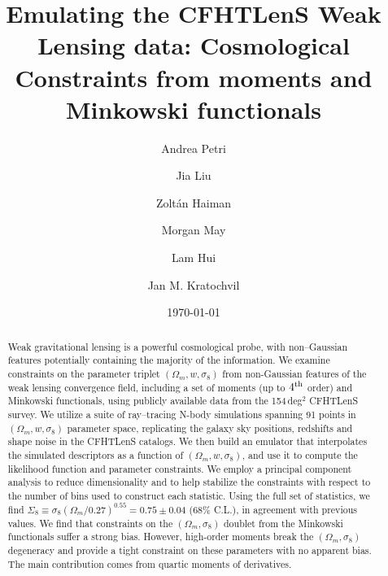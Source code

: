 \documentclass[reprint,aps,prd,superscriptaddress,showkeys,showpacs]{revtex4-1}
\begin{document}
\title{Emulating the CFHTLenS Weak Lensing data:  Cosmological Constraints from moments and Minkowski functionals}

\author{Andrea Petri}

\author{Jia Liu}

\author{Zolt\'an Haiman}

\author{Morgan May}

\author{Lam Hui}

\author{Jan M. Kratochvil}

\date{\today}

\label{firstpage}

\begin{abstract}
Weak gravitational lensing is a powerful cosmological probe, with
non--Gaussian features potentially containing the majority of the
information. We examine constraints on the parameter triplet
$(\Omega_m,w,\sigma_8)$ from non-Gaussian features of the weak lensing
convergence field, including a set of moments (up to $4^{\rm th}$
order) and Minkowski functionals, using publicly available data from
the 154\,deg$^2$ CFHTLenS survey. We utilize a suite of ray--tracing
N-body simulations spanning 91 points in $(\Omega_m,w,\sigma_8)$
parameter space, replicating the galaxy sky positions, redshifts and
shape noise in the CFHTLenS catalogs. We then build an emulator that
interpolates the simulated descriptors as a function of
$(\Omega_m,w,\sigma_8)$, and use it to compute the likelihood function
and parameter constraints. We employ a principal component analysis to
reduce dimensionality and to help stabilize the constraints with
respect to the number of bins used to construct each statistic. Using
the full set of statistics, we find
$\Sigma_8\equiv\sigma_8(\Omega_m/0.27)^{0.55}=0.75\pm0.04$ (68\%
C.L.), in agreement with previous values. We find that constraints on
the $(\Omega_m,\sigma_8)$ doublet from the Minkowski functionals
suffer a strong bias. However, high-order moments break the
$(\Omega_m,\sigma_8)$ degeneracy and provide a tight constraint on
these parameters with no apparent bias.  The main contribution comes
from quartic moments of derivatives.
\end{abstract}
\end{document}
